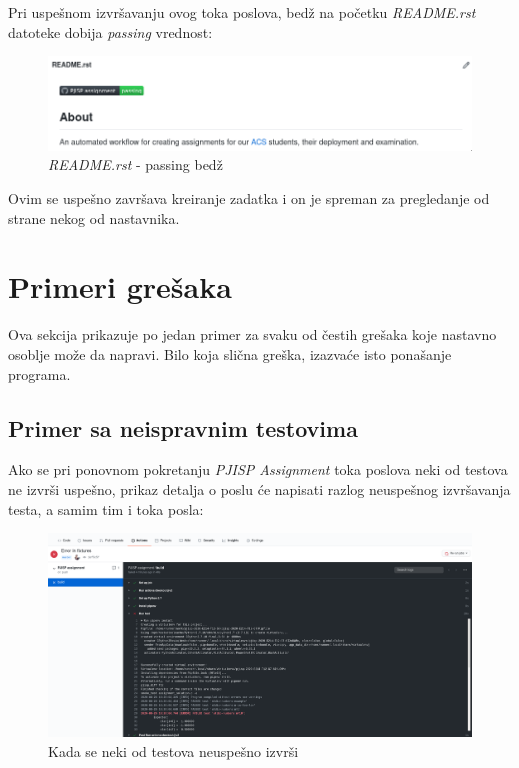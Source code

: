 \documentclass[12pt]{report}
\begin{document}
Pri uspešnom izvršavanju ovog toka poslova, bedž na početku \textit{README.rst} datoteke dobija \textit{passing} vrednost:

\begin{figure}[H]
    \centering
    \includegraphics[width=\linewidth]{images/14.png}
    \caption{\textit{README.rst} - passing bedž}
\end{figure}

Ovim se uspešno završava kreiranje zadatka i on je spreman za pregledanje od strane nekog od nastavnika.

\section{Primeri grešaka}
Ova sekcija prikazuje po jedan primer za svaku od čestih grešaka koje nastavno osoblje može da napravi. Bilo koja slična greška, izazvaće isto ponašanje programa.

\subsection{Primer sa neispravnim testovima}

Ako se pri ponovnom pokretanju \textit{PJISP Assignment} toka poslova neki od testova ne izvrši uspešno, prikaz detalja o poslu će napisati razlog neuspešnog izvršavanja testa, a samim tim i toka posla:

\begin{figure}[H]
    \centering
    \includegraphics[width=\linewidth]{images/15.png}
    \caption{Kada se neki od testova neuspešno izvrši}
\end{figure}
\end{document}
